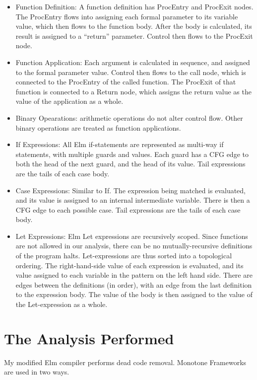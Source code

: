\documentclass{article}
\begin{document}
\begin{itemize}
\item
  Function Definition: A function definition has ProcEntry and ProcExit nodes. The ProcEntry flows into assigning each formal parameter to its variable value, which then flows to the function body. After the body is calculated, its result is assigned to a ``return'' parameter. Control then flows to the ProcExit node.
\item
  Function Application: Each argument is calculated in sequence, and assigned to the formal parameter value. Control then flows to the call node, which is connected to the ProcEntry of the called function. The ProcExit of that function is connected to a Return node, which assigns the return value as the value of the application as a whole.
\item
  Binary Opearations: arithmetic operations do not alter control flow. Other binary operations are treated as function applications.
\item
  If Expressions: All Elm if-statements are represented as multi-way if statements, with multiple guards and values. Each guard has a CFG edge to both the head of the next guard, and the head of its value. Tail expressions are the tails of each case body.
\item
  Case Expressions: Similar to If. The expression being matched is evaluated, and its value is assigned to an internal intermediate variable. There is then a CFG edge to each possible case. Tail expressions are the tails of each case body.
\item
  Let Expressions: Elm Let expressions are recursively scoped. Since functions are not allowed in our analysis, there can be no mutually-recursive definitions of the program halts. Let-expressions are thus sorted into a topological ordering. The right-hand-side value of each expression is evaluated, and its value assigned to each variable in the pattern on the left hand side. There are edges between the definitions (in order), with an edge from the last definition to the expression body. The value of the body is then assigned to the value of the Let-expression as a whole.
\end{itemize}

\section{The Analysis Performed}

My modified Elm compiler performs dead code removal. Monotone Frameworks are used in two ways.
\end{document}
